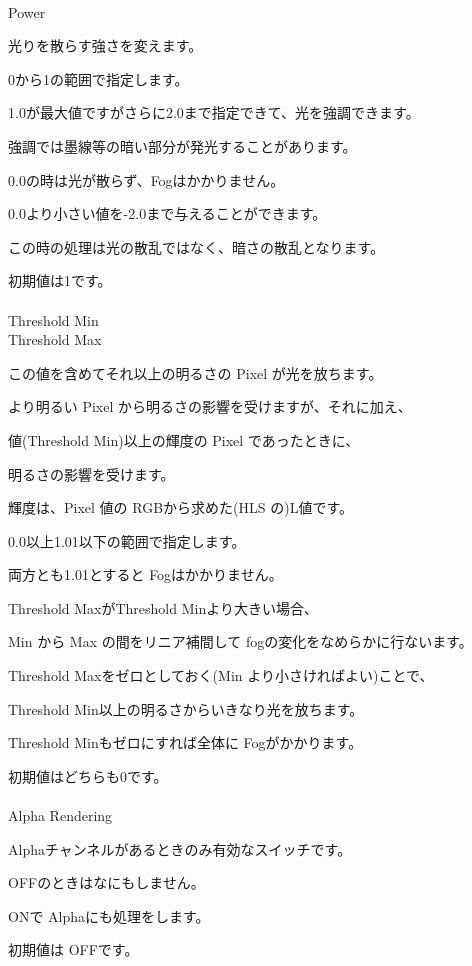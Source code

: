 \documentclass[a4paper,12pt]{article}
\begin{document}
\newpage

\thispagestyle{empty}

\ \vspace{-0.2em}
\par
\noindent Power\par
光りを散らす強さを変えます。\par
0から1の範囲で指定します。\par
1.0が最大値ですがさらに2.0まで指定できて、光を強調できます。\par
強調では墨線等の暗い部分が発光することがあります。\par
0.0の時は光が散らず、Fogはかかりません。\par
0.0より小さい値を-2.0まで与えることができます。\par
この時の処理は光の散乱ではなく、暗さの散乱となります。\par
初期値は1です。\\
\\
Threshold Min\\
Threshold Max\par
この値を含めてそれ以上の明るさの Pixel が光を放ちます。\\
\par
より明るい Pixel から明るさの影響を受けますが、それに加え、\par
値(\textquotedbl Threshold Min\textquotedbl )以上の輝度の Pixel であったときに、\par
明るさの影響を受けます。\par
輝度は、Pixel 値の RGBから求めた(HLS の)L値です。\\
\par
0.0以上1.01以下の範囲で指定します。\\
\par
両方とも1.01とすると Fogはかかりません。\\
\par
\textquotedbl Threshold Max\textquotedbl が\textquotedbl Threshold Min\textquotedbl より大きい場合、\par
Min から Max の間をリニア補間して fogの変化をなめらかに行ないます。\\
\par
\textquotedbl Threshold Max\textquotedbl をゼロとしておく(Min より小さければよい)ことで、\par
\textquotedbl Threshold Min\textquotedbl 以上の明るさからいきなり光を放ちます。\par
\textquotedbl Threshold Min\textquotedbl もゼロにすれば全体に Fogがかかります。\\
\par
初期値はどちらも0です。\\
\\
Alpha Rendering\par
Alphaチャンネルがあるときのみ有効なスイッチです。\par
OFFのときはなにもしません。\par
ONで Alphaにも処理をします。\par
初期値は OFFです。
\end{document}
